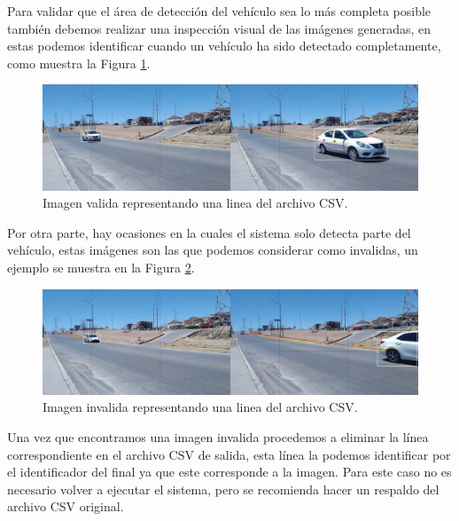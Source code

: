 Para validar que el área de detección del vehículo sea lo más completa posible también debemos realizar una inspección visual de las imágenes generadas, en estas podemos identificar cuando un vehículo ha sido detectado completamente, como muestra la Figura \ref{fig:ImagenValida}.

\begin{figure}[H]
    \centering
    \includegraphics[width=1\textwidth]{Metodologia/imgs/Valido.jpg}
    \caption{Imagen valida representando una linea del archivo CSV.}
    \label{fig:ImagenValida}
\end{figure}

Por otra parte, hay ocasiones en la cuales el sistema solo detecta parte del vehículo, estas imágenes son las que podemos considerar como invalidas, un ejemplo se muestra en la Figura \ref{fig:ImagenInvalida}.

\begin{figure}[H]
    \centering
    \includegraphics[width=1\textwidth]{Metodologia/imgs/Invalido.jpg}
    \caption{Imagen invalida representando una linea del archivo CSV.}
    \label{fig:ImagenInvalida}
\end{figure}

Una vez que encontramos una imagen invalida procedemos a eliminar la línea correspondiente en el archivo CSV de salida, esta línea la podemos identificar por el identificador del final ya que este corresponde a la imagen. Para este caso no es necesario volver a ejecutar el sistema, pero se recomienda hacer un respaldo del archivo CSV original.
